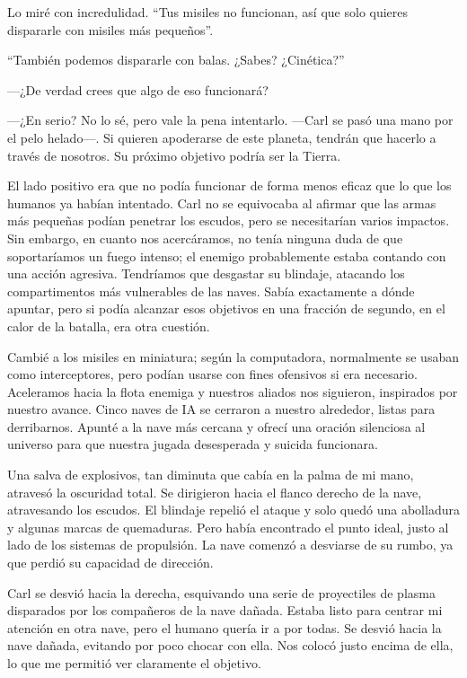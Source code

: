 Lo miré con incredulidad. ``Tus misiles no funcionan, así que solo quieres dispararle con misiles más pequeños''.

``También podemos dispararle con balas. ¿Sabes? ¿Cinética?''


—¿De verdad crees que algo de eso funcionará?

—¿En serio? No lo sé, pero vale la pena intentarlo. —Carl se pasó una mano por el pelo helado—. Si quieren apoderarse de este planeta, tendrán que hacerlo a través de nosotros. Su próximo objetivo podría ser la Tierra.

El lado positivo era que no podía funcionar de forma menos eficaz que lo que los humanos ya habían intentado. Carl no se equivocaba al afirmar que las armas más pequeñas podían penetrar los escudos, pero se necesitarían varios impactos. Sin embargo, en cuanto nos acercáramos, no tenía ninguna duda de que soportaríamos un fuego intenso; el enemigo probablemente estaba contando con una acción agresiva. Tendríamos que desgastar su blindaje, atacando los compartimentos más vulnerables de las naves. Sabía exactamente a dónde apuntar, pero si podía alcanzar esos objetivos en una fracción de segundo, en el calor de la batalla, era otra cuestión.

Cambié a los misiles en miniatura; según la computadora, normalmente se usaban como interceptores, pero podían usarse con fines ofensivos si era necesario. Aceleramos hacia la flota enemiga y nuestros aliados nos siguieron, inspirados por nuestro avance. Cinco naves de IA se cerraron a nuestro alrededor, listas para derribarnos. Apunté a la nave más cercana y ofrecí una oración silenciosa al universo para que nuestra jugada desesperada y suicida funcionara.

Una salva de explosivos, tan diminuta que cabía en la palma de mi mano, atravesó la oscuridad total. Se dirigieron hacia el flanco derecho de la nave, atravesando los escudos. El blindaje repelió el ataque y solo quedó una abolladura y algunas marcas de quemaduras. Pero había encontrado el punto ideal, justo al lado de los sistemas de propulsión. La nave comenzó a desviarse de su rumbo, ya que perdió su capacidad de dirección.

Carl se desvió hacia la derecha, esquivando una serie de proyectiles de plasma disparados por los compañeros de la nave dañada. Estaba listo para centrar mi atención en otra nave, pero el humano quería ir a por todas. Se desvió hacia la nave dañada, evitando por poco chocar con ella. Nos colocó justo encima de ella, lo que me permitió ver claramente el objetivo.

